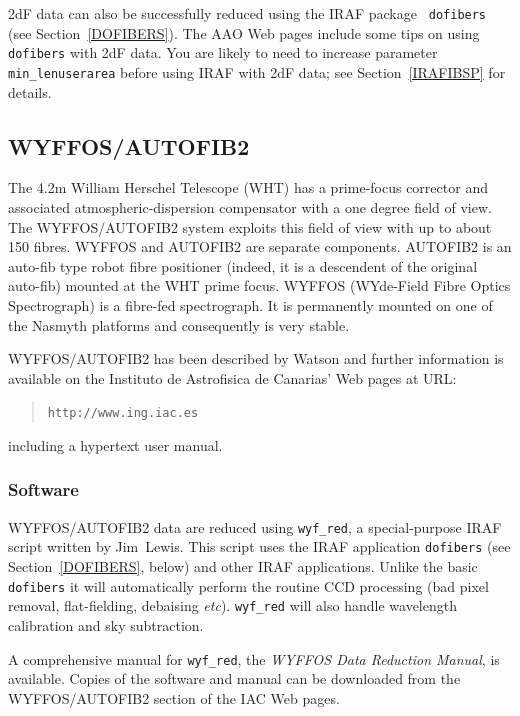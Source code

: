 \documentclass[twoside,11pt]{article}
\newcommand{\htmladdnormallink}[2]{#1}
\begin{document}
2dF data can also be successfully reduced using the IRAF package {\tt
dofibers} (see Section~\ref{DOFIBERS}).  The AAO Web pages include
some tips on \htmladdnormallink{using {\tt dofibers} with 2dF data}
{http://www.phys.unsw.edu.au/\~{}mjd/2df/}.  You are likely to need to
increase parameter {\tt min\_lenuserarea} before using IRAF with 2dF
data; see Section~\ref{IRAFIBSP} for details.

\subsection{\label{WYFFOS_I}WYFFOS/AUTOFIB2}

The 4.2m William Herschel Telescope (WHT) has a prime-focus corrector
and associated 
\newline atmospheric-dispersion compensator with a one degree
field of view.  The WYFFOS/AUTOFIB2 system exploits this field of
view with up to about 150 fibres.  WYFFOS and AUTOFIB2 are separate
components.  AUTOFIB2 is an auto-fib type robot fibre positioner
(indeed, it is a descendent of the original auto-fib) mounted at the
WHT prime focus.  WYFFOS (WYde-Field Fibre Optics Spectrograph) is a
fibre-fed spectrograph.  It is permanently mounted on one of the Nasmyth
platforms and consequently is very stable.

WYFFOS/AUTOFIB2 has been described by Watson\cite{WATSON95} and
further information is available on the Instituto de Astrofisica de
Canarias' Web pages at URL:

\begin{quote}
\htmladdnormallink{ {\tt http://www.ing.iac.es} }{http://www.ing.iac.es}
\end{quote}

including a hypertext user manual.

\subsubsection{\label{WYFFOS_S}Software}

WYFFOS/AUTOFIB2 data are reduced using {\tt wyf\_red}, a special-purpose
IRAF script written by Jim~Lewis.  This script uses the IRAF application
{\tt dofibers} (see Section~\ref{DOFIBERS}, below) and other IRAF
applications.  Unlike the basic {\tt dofibers} it will automatically
perform the routine CCD processing (bad pixel removal, flat-fielding,
debaising \emph{etc}).  {\tt wyf\_red} will also handle wavelength calibration
and sky subtraction.

A comprehensive manual for {\tt wyf\_red}, the {\it WYFFOS Data
Reduction Manual}\/\cite{LEWIS96}, is available.  Copies of the software
and manual can be downloaded from the WYFFOS/AUTOFIB2 section of the
IAC Web pages.
\end{document}
